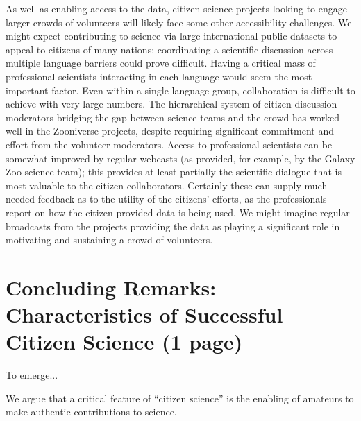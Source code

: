 \documentclass{ar2e}
\begin{document}
 


As well as enabling access to the data, citizen science projects looking to
engage larger crowds of volunteers will likely face some other accessibility
challenges. We might expect contributing to science via large international
public datasets to appeal to citizens of many nations: coordinating a scientific
discussion across multiple language barriers could prove difficult. Having a
critical mass of professional scientists interacting in each language would seem
the most important factor. Even within a single language group, collaboration is
difficult to achieve with  very large numbers. The hierarchical system of
citizen discussion  moderators bridging the gap between science teams and the
crowd has worked well in the Zooniverse projects, despite requiring significant
commitment and effort from the volunteer moderators. Access to professional
scientists can be somewhat improved by regular webcasts (as provided, for
example, by the Galaxy Zoo science team); this provides at least partially the
scientific dialogue that is most valuable to the citizen collaborators.
Certainly these can supply much needed feedback as to the utility of the
citizens' efforts, as the professionals report on how the citizen-provided data
is being used. We might imagine regular broadcasts from the projects providing
the data as playing a significant role in motivating and sustaining a crowd of
volunteers.



\section{Concluding Remarks: Characteristics of Successful Citizen Science (1 page)}
\label{sec:conclusions}


To emerge...

We argue that a critical feature of ``citizen science'' is the enabling of 
amateurs to make authentic contributions to science. 
\end{document}
